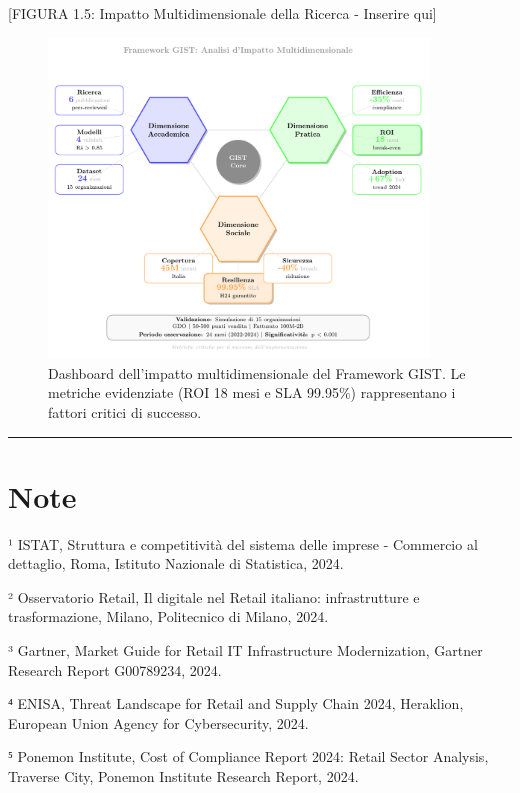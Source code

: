 \documentclass[12pt,a4paper,oneside]{book}
\begin{document}
{[}FIGURA 1.5: Impatto Multidimensionale della Ricerca - Inserire qui{]}

\begin{figure}[htbp]
    \centering
    \includegraphics[width=0.9\textwidth]{figura 1-5}
    \caption{Dashboard dell'impatto multidimensionale del Framework GIST. Le metriche evidenziate (ROI 18 mesi e SLA 99.95\%) rappresentano i fattori critici di successo.}
    \label{fig:impatto_gist}
\end{figure}

\begin{center}\rule{0.5\linewidth}{0.5pt}\end{center}

\section{\texorpdfstring{\textbf{Note}}{Note}}\label{note}

¹ ISTAT, Struttura e competitività del sistema delle imprese - Commercio
al dettaglio, Roma, Istituto Nazionale di Statistica, 2024.

² Osservatorio Retail, Il digitale nel Retail italiano: infrastrutture e
trasformazione, Milano, Politecnico di Milano, 2024.

³ Gartner, Market Guide for Retail IT Infrastructure Modernization,
Gartner Research Report G00789234, 2024.

⁴ ENISA, Threat Landscape for Retail and Supply Chain 2024, Heraklion,
European Union Agency for Cybersecurity, 2024.

⁵ Ponemon Institute, Cost of Compliance Report 2024: Retail Sector
Analysis, Traverse City, Ponemon Institute Research Report, 2024.
\end{document}
